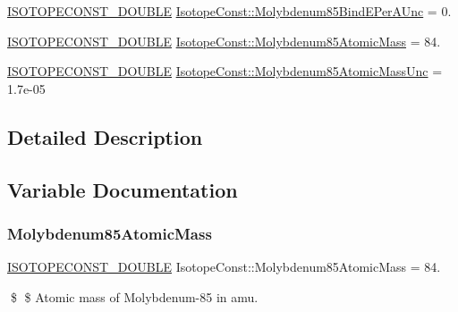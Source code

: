 \begin{DoxyCompactItemize}
\mbox{\hyperlink{group___isotope_const-_macros_ga8f45a7272ce02c0b4c65c44636ed719a}{I\+S\+O\+T\+O\+P\+E\+C\+O\+N\+S\+T\+\_\+\+D\+O\+U\+B\+LE}} \mbox{\hyperlink{group___isotope_const-_molybdenum-_mo85_ga4bee85c649124a65aab586b09bd0e993}{Isotope\+Const\+::\+Molybdenum85\+Bind\+E\+Per\+A\+Unc}} = 0.
\item 
\mbox{\hyperlink{group___isotope_const-_macros_ga8f45a7272ce02c0b4c65c44636ed719a}{I\+S\+O\+T\+O\+P\+E\+C\+O\+N\+S\+T\+\_\+\+D\+O\+U\+B\+LE}} \mbox{\hyperlink{group___isotope_const-_molybdenum-_mo85_ga605ea600e2807e436b8a7a91b9311964}{Isotope\+Const\+::\+Molybdenum85\+Atomic\+Mass}} = 84.
\item 
\mbox{\hyperlink{group___isotope_const-_macros_ga8f45a7272ce02c0b4c65c44636ed719a}{I\+S\+O\+T\+O\+P\+E\+C\+O\+N\+S\+T\+\_\+\+D\+O\+U\+B\+LE}} \mbox{\hyperlink{group___isotope_const-_molybdenum-_mo85_ga32856e0873bf836e5ef0691464a47307}{Isotope\+Const\+::\+Molybdenum85\+Atomic\+Mass\+Unc}} = 1.\+7e-\/05
\end{DoxyCompactItemize}


\subsection{Detailed Description}


\subsection{Variable Documentation}
\mbox{\label{group___isotope_const-_molybdenum-_mo85_ga605ea600e2807e436b8a7a91b9311964}} 
\subsubsection{\texorpdfstring{Molybdenum85\+Atomic\+Mass}{Molybdenum85AtomicMass}}
{\footnotesize\ttfamily \mbox{\hyperlink{group___isotope_const-_macros_ga8f45a7272ce02c0b4c65c44636ed719a}{I\+S\+O\+T\+O\+P\+E\+C\+O\+N\+S\+T\+\_\+\+D\+O\+U\+B\+LE}} Isotope\+Const\+::\+Molybdenum85\+Atomic\+Mass = 84.}

\$ \$ Atomic mass of Molybdenum-\/85 in amu. \mbox{\label{group___isotope_const-_molybdenum-_mo85_ga32856e0873bf836e5ef0691464a47307}} 
